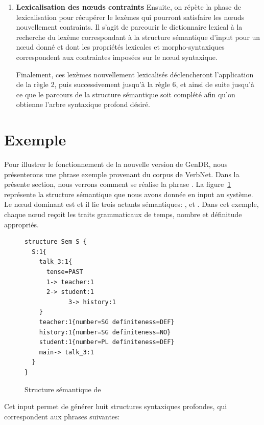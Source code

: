\begin{enumerate}
	\item \textbf{Lexicalisation des n\oe{}uds contraints}
Ensuite, on répète la phase de lexicalisation pour récupérer le lexèmes qui pourront satisfaire les n\oe{}uds nouvellement contraints. Il s'agit de parcourir le dictionnaire lexical à la recherche du lexème correspondant à la structure sémantique d'input pour un n\oe{}ud donné et dont les propriétés lexicales et morpho-syntaxiques correspondent aux contraintes imposées sur le n\oe{}ud syntaxique.

Finalement, ces lexèmes nouvellement lexicalisés déclencheront l'application de la règle 2, puis successivement jusqu'à la règle 6, et ainsi de suite jusqu'à ce que le parcours de la structure sémantique soit complété afin qu'on obtienne l'arbre syntaxique profond désiré.

\end{enumerate} 

\section{Exemple}

Pour illustrer le fonctionnement de la nouvelle version de GenDR, nous présenterons une phrase exemple provenant du corpus de VerbNet. Dans la présente section, nous verrons comment se réalise la phrase . La figure~\ref{fig:history} représente la structure sémantique que nous avons donnée en input au système. Le n\oe{}ud dominant est  et il lie trois actants sémantiques: ,  et . Dans cet exemple, chaque n\oe{}ud reçoit les traits grammaticaux de temps, nombre et définitude appropriés.

\begin{figure}[htb]
  \caption{Structure sémantique de }
	\label{fig:history}
\begin{lstlisting}[language=mate]
structure Sem S {
  S:1{
    talk_3:1{
      tense=PAST 
      1-> teacher:1
      2-> student:1
			3-> history:1
    }
    teacher:1{number=SG definiteness=DEF}
    history:1{number=SG definiteness=NO}
    student:1{number=PL definiteness=DEF}
    main-> talk_3:1
  }
}
\end{lstlisting}
\end{figure}

Cet input permet de générer huit structures syntaxiques profondes, qui correspondent aux phrases suivantes:

